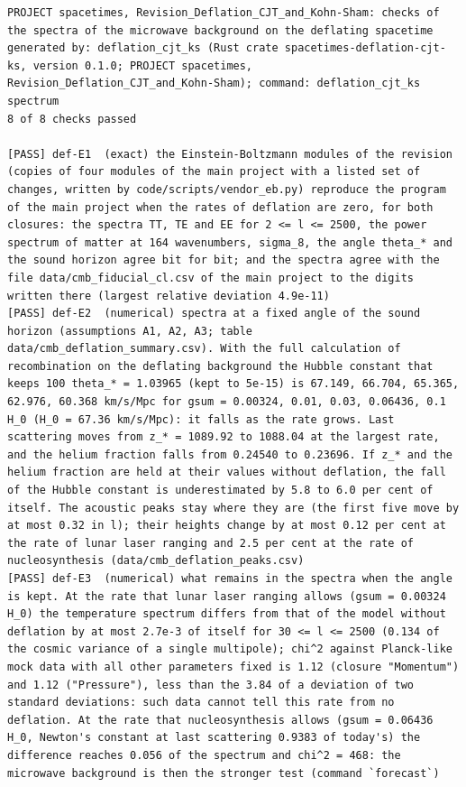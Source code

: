 \documentclass[
  10pt,
]{article}
\begin{document}
\begin{verbatim}
PROJECT spacetimes, Revision_Deflation_CJT_and_Kohn-Sham: checks of the spectra of the microwave background on the deflating spacetime
generated by: deflation_cjt_ks (Rust crate spacetimes-deflation-cjt-ks, version 0.1.0; PROJECT spacetimes, Revision_Deflation_CJT_and_Kohn-Sham); command: deflation_cjt_ks spectrum
8 of 8 checks passed

[PASS] def-E1  (exact) the Einstein-Boltzmann modules of the revision (copies of four modules of the main project with a listed set of changes, written by code/scripts/vendor_eb.py) reproduce the program of the main project when the rates of deflation are zero, for both closures: the spectra TT, TE and EE for 2 <= l <= 2500, the power spectrum of matter at 164 wavenumbers, sigma_8, the angle theta_* and the sound horizon agree bit for bit; and the spectra agree with the file data/cmb_fiducial_cl.csv of the main project to the digits written there (largest relative deviation 4.9e-11)
[PASS] def-E2  (numerical) spectra at a fixed angle of the sound horizon (assumptions A1, A2, A3; table data/cmb_deflation_summary.csv). With the full calculation of recombination on the deflating background the Hubble constant that keeps 100 theta_* = 1.03965 (kept to 5e-15) is 67.149, 66.704, 65.365, 62.976, 60.368 km/s/Mpc for gsum = 0.00324, 0.01, 0.03, 0.06436, 0.1 H_0 (H_0 = 67.36 km/s/Mpc): it falls as the rate grows. Last scattering moves from z_* = 1089.92 to 1088.04 at the largest rate, and the helium fraction falls from 0.24540 to 0.23696. If z_* and the helium fraction are held at their values without deflation, the fall of the Hubble constant is underestimated by 5.8 to 6.0 per cent of itself. The acoustic peaks stay where they are (the first five move by at most 0.32 in l); their heights change by at most 0.12 per cent at the rate of lunar laser ranging and 2.5 per cent at the rate of nucleosynthesis (data/cmb_deflation_peaks.csv)
[PASS] def-E3  (numerical) what remains in the spectra when the angle is kept. At the rate that lunar laser ranging allows (gsum = 0.00324 H_0) the temperature spectrum differs from that of the model without deflation by at most 2.7e-3 of itself for 30 <= l <= 2500 (0.134 of the cosmic variance of a single multipole); chi^2 against Planck-like mock data with all other parameters fixed is 1.12 (closure "Momentum") and 1.12 ("Pressure"), less than the 3.84 of a deviation of two standard deviations: such data cannot tell this rate from no deflation. At the rate that nucleosynthesis allows (gsum = 0.06436 H_0, Newton's constant at last scattering 0.9383 of today's) the difference reaches 0.056 of the spectrum and chi^2 = 468: the microwave background is then the stronger test (command `forecast`)

\end{verbatim}
\end{document}
